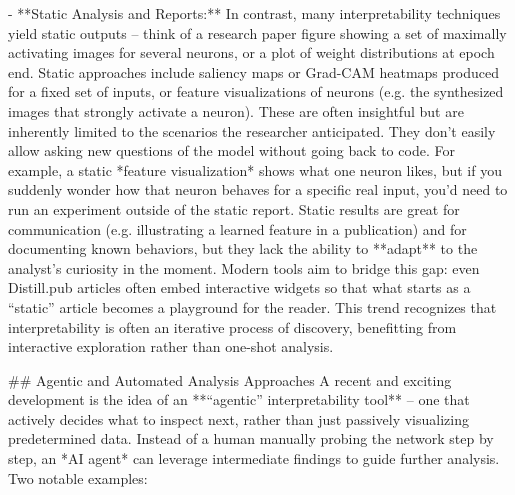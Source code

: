 - **Static Analysis and Reports:** In contrast, many interpretability techniques yield static outputs – think of a research paper figure showing a set of maximally activating images for several neurons, or a plot of weight distributions at epoch end. Static approaches include saliency maps or Grad-CAM heatmaps produced for a fixed set of inputs, or feature visualizations of neurons (e.g. the synthesized images that strongly activate a neuron). These are often insightful but are inherently limited to the scenarios the researcher anticipated. They don’t easily allow asking new questions of the model without going back to code. For example, a static *feature visualization* shows what one neuron likes, but if you suddenly wonder how that neuron behaves for a specific real input, you’d need to run an experiment outside of the static report. Static results are great for communication (e.g. illustrating a learned feature in a publication) and for documenting known behaviors, but they lack the ability to **adapt** to the analyst’s curiosity in the moment. Modern tools aim to bridge this gap: even Distill.pub articles often embed interactive widgets so that what starts as a “static” article becomes a playground for the reader. This trend recognizes that interpretability is often an iterative process of discovery, benefitting from interactive exploration rather than one-shot analysis.

## Agentic and Automated Analysis Approaches
A recent and exciting development is the idea of an **“agentic” interpretability tool** – one that actively decides what to inspect next, rather than just passively visualizing predetermined data. Instead of a human manually probing the network step by step, an *AI agent* can leverage intermediate findings to guide further analysis. Two notable examples:

